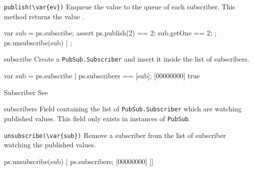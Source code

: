 \begin{urbiscriptapi}

\item \lstinline|publish(\var{ev})|
  Enqueue the value  to the queue of each subscriber.  This method
  returns the value .

\begin{urbiscript}
{ var sub = ps.subscribe;
  assert {
    ps.publish(2) == 2;
    sub.getOne == 2;
  };
  ps.unsubscribe(sub)
} | {};
\end{urbiscript}

\item[subscribe]
  Create a \lstinline|PubSub.Subscriber| and insert it inside the list of
  subscribers.

\begin{urbiscript}
var sub = ps.subscribe |
ps.subscribers == [sub];
[00000000] true
\end{urbiscript}

\item[Subscriber] See 

\item[subscribers]
  Field containing the list of \lstinline|PubSub.Subscriber| which are
  watching published values.  This field only exists in instances of
  \lstinline|PubSub|.

\item \lstinline|unsubscribe(\var{sub})|
  Remove a subscriber from the list of subscriber watching the published
  values.

\begin{urbiscript}
ps.unsubscribe(sub) |
ps.subscribers;
[00000000] []
\end{urbiscript}


\end{urbiscriptapi}

